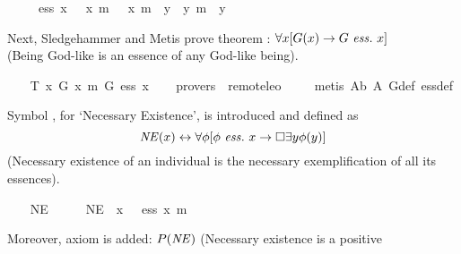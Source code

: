 \begin{isabellebody}
\ \ \ \ {\isachardoublequoteopen}{\isasymPhi}\ ess\ x\ {\isacharequal}\ {\isasymPhi}\ x\ m{\isasymand}\ {\isasymforall}{\isacharparenleft}{\isasymlambda}{\isasymPsi}{\isachardot}\ {\isasymPsi}\ x\ m{\isasymrightarrow}\ {\isasymbox}\ {\isacharparenleft}{\isasymforall}{\isacharparenleft}{\isasymlambda}y{\isachardot}\ {\isasymPhi}\ y\ m{\isasymrightarrow}\ {\isasymPsi}\ y{\isacharparenright}{\isacharparenright}{\isacharparenright}{\isachardoublequoteclose}%
\begin{isamarkuptext}%
Next, Sledgehammer and Metis prove theorem : $\forall x [G(x) \rightarrow G \ \mathit{ess.} \ x]$ \\
(Being God-like is an essence of any God-like being).%
\end{isamarkuptext}%
\isamarkuptrue%
\ \ \isamarkupfalse%
\ T{}{\isacharcolon}\ {\isachardoublequoteopen}{\isacharbrackleft}{\isasymforall}{\isacharparenleft}{\isasymlambda}x{\isachardot}\ G\ x\ m{\isasymrightarrow}\ G\ ess\ x{\isacharparenright}{\isacharbrackright}{\isachardoublequoteclose}\isanewline
\ \ \isamarkupfalse%
\ {\isacharbrackleft}provers\ {\isacharequal}\ remote{\isacharunderscore}leo{}{\isacharbrackright}\ \isanewline
%
\isadelimproof
\ \ %
\endisadelimproof
%
\isatagproof
{}\isamarkupfalse%
\ {\isacharparenleft}metis\ A{}b\ A{}\ G{\isacharunderscore}def\ ess{\isacharunderscore}def{\isacharparenright}%
\endisatagproof
{\isafoldproof}%
%
\isadelimproof
%
\endisadelimproof
%
\begin{isamarkuptext}%
Symbol , for `Necessary Existence', is introduced and
defined as $$\mathit{NE}(x) \leftrightarrow \forall \phi [\phi \ \mathit{ess.} \ x \rightarrow \Box \exists y \phi(y)]$$ (Necessary 
existence of an individual is the necessary exemplification of all its essences).%
\end{isamarkuptext}%
\isamarkuptrue%
\ \ \isamarkupfalse%
\ NE\ {\isacharcolon}{\isacharcolon}\ {\isachardoublequoteopen}{\isasymmu}\ {\isasymRightarrow}\ {\isasymsigma}{\isachardoublequoteclose}\ \ {\isachardoublequoteopen}NE\ {\isacharequal}\ {\isacharparenleft}{\isasymlambda}x{\isachardot}\ {\isasymforall}{\isacharparenleft}{\isasymlambda}{\isasymPhi}{\isachardot}\ {\isasymPhi}\ ess\ x\ m{\isasymrightarrow}\ {\isasymbox}\ {\isacharparenleft}{\isasymexists}\ {\isasymPhi}{\isacharparenright}{\isacharparenright}{\isacharparenright}{\isachardoublequoteclose}%
\begin{isamarkuptext}%
Moreover, axiom  is added: $P(\mathit{NE})$ (Necessary existence is a positive 

\end{isamarkuptext}
\end{isabellebody}
